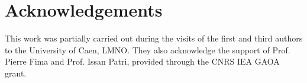 \documentclass[10pt]{amsart}
\theoremstyle{definition}
\theoremstyle{myremark}
\numberwithin{equation}{section}
\begin{document}
\section{Acknowledgements}
This work was partially carried out during the visits of the first and third authors to the University of Caen, LMNO. They also acknowledge the support of Prof. Pierre Fima and Prof. Issan Patri, provided through the CNRS IEA GAOA grant.

    




\providecommand{\bysame}{\leavevmode\hbox to3em{\hrulefill}\thinspace}
\providecommand{\MR}{\relax\ifhmode\unskip\space\fi MR }
\providecommand{\MRhref}[2]{%
  \href{http://www.ams.org/mathscinet-getitem?mr=#1}{#2}
}
\end{document}
